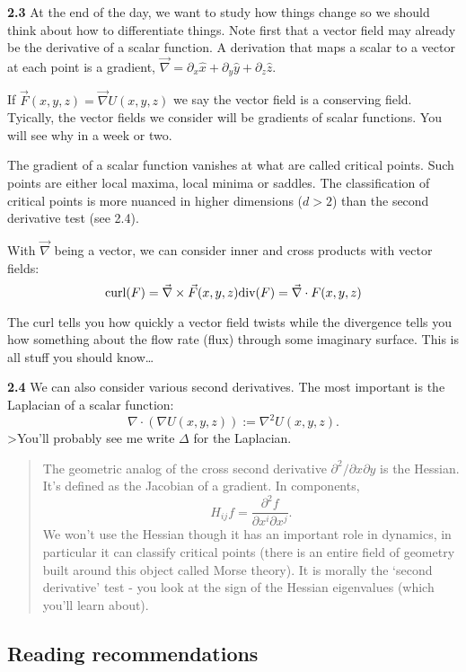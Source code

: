 \documentclass[11pt]{article}
\begin{document}
\textbf{2.3} At the end of the day, we want to study how things change
so we should think about how to differentiate things. Note first that a
vector field may already be the derivative of a scalar function. A
derivation that maps a scalar to a vector at each point is a gradient,
\(\vec \nabla=\partial_x \hat x+\partial_y\hat y+\partial_z\hat z\).

If \(\vec F(x,y,z) =\vec \nabla U(x,y,z)\) we say the vector field is a
conserving field. Tyically, the vector fields we consider will be
gradients of scalar functions. You will see why in a week or two.

The gradient of a scalar function vanishes at what are called critical
points. Such points are either local maxima, local minima or saddles.
The classification of critical points is more nuanced in higher
dimensions (\(d>2\)) than the second derivative test (see 2.4).

With $\vec \nabla $ being a vector, we can consider inner and cross
products with vector fields: \[
\text{curl}(F) = \vec\nabla\times \vec F(x,y,z)\\
\text{div}(F) = \vec\nabla \cdot F(x,y,z)
\]

The curl tells you how quickly a vector field twists while the
divergence tells you how something about the flow rate (flux) through
some imaginary surface. This is all stuff you should know\ldots{}

\textbf{2.4} We can also consider various second derivatives. The most
important is the Laplacian of a scalar function: \[
\nabla\cdot(\nabla U(x,y,z)):=\nabla^2U(x,y,z).
\] \textgreater You'll probably see me write \(\Delta\) for the
Laplacian.

\begin{quote}
The geometric analog of the cross second derivative
\(\partial^2/\partial x\partial y\) is the Hessian. It's defined as the
Jacobian of a gradient. In components, \[
H_{ij}f=\frac{\partial^2 f}{\partial x^i\partial x^j}.
\] We won't use the Hessian though it has an important role in dynamics,
in particular it can classify critical points (there is an entire field
of geometry built around this object called Morse theory). It is morally
the `second derivative' test - you look at the sign of the Hessian
eigenvalues (which you'll learn about).
\end{quote}

\hypertarget{reading-recommendations}{%
\subsection{Reading recommendations}\label{reading-recommendations}}
\end{document}
